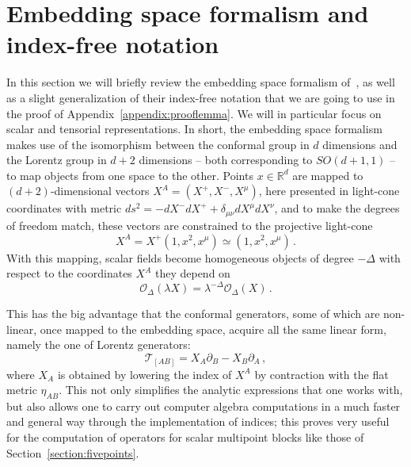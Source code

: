 \documentclass{article}
\begin{document}
\section{Embedding space formalism and index-free notation}
\label{appendix:Embeddingspace}
In this section we will briefly review the embedding space formalism of~\cite{Costa:2011mg}, as well as a slight generalization of their index-free notation that we are going to use in the proof of Appendix~\ref{appendix:prooflemma}. We will in particular focus on scalar and tensorial representations. In short, the embedding space formalism makes use of the isomorphism between the conformal group in $d$ dimensions and the Lorentz group in $d+2$ dimensions -- both corresponding to $SO(d+1,1)$ -- to map objects from one space to the other. Points $x\in\mathbb{R}^d$ are mapped to $(d+2)$-dimensional vectors $X^A=(X^+,X^-,X^\mu)$, here presented in light-cone coordinates with metric $ds^2 = -dX^- dX^+ + \delta_{\mu\nu} dX^\mu dX^\nu$, and to make the degrees of freedom match, these vectors are constrained to the projective light-cone
\begin{equation}
	X^A=X^+(1,x^2,x^\mu)\simeq(1,x^2,x^\mu)\,.
\end{equation} 
With this mapping, scalar fields become homogeneous objects of degree $-\Delta$ with respect to the coordinates $X^A$ they depend on
	\begin{equation}
	    \mathcal{O}_\Delta(\lambda X)= \lambda^{-\Delta} \mathcal{O}_\Delta(X)\,.
	\end{equation}
	
	This has the big advantage that the conformal generators, some of which are non-linear, once mapped to the embedding space, acquire all the same linear form, namely the one of Lorentz generators:
	\begin{equation}
		\mathcal{T}_{[AB]}=X_{A}\partial_B-X_{B}\partial_A\,,
		\label{generatorsscalar}
	\end{equation}
	where $X_A$ is obtained by lowering the index of $X^A$ by contraction with the flat metric $\eta_{AB}$.
	This not only simplifies the analytic expressions that one works with, but also allows one to carry out computer algebra computations in a much faster and general way through the implementation of indices; this proves very useful for the computation of operators for scalar multipoint blocks like those of Section~\ref{section:fivepoints}. 
	
\end{document}
